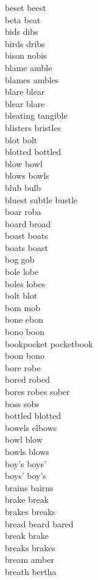 beset beest\\
beta beat\\
bids dibs\\
birds dribs\\
bison nobis\\
blame amble\\
blames ambles\\
blare blear\\
blear blare\\
bleating tangible\\
blisters bristles\\
blot bolt\\
blotted bottled\\
blow bowl\\
blows bowls\\
blub bulb\\
bluest subtle bustle\\
boar roba\\
board broad\\
boast boats\\
boats boast\\
bog gob\\
bole lobe\\
boles lobes\\
bolt blot\\
bom mob\\
bone ebon\\
bono boon\\
bookpocket pocketbook\\
boon bono\\
bore robe\\
bored robed\\
bores robes sober\\
boss sobs\\
bottled blotted\\
bowels elbows\\
bowl blow\\
bowls blows\\
boy's boys'\\
boys' boy's\\
brains bairns\\
brake break\\
brakes breaks\\
bread beard bared\\
break brake\\
breaks brakes\\
bream amber\\
breath bertha\\
